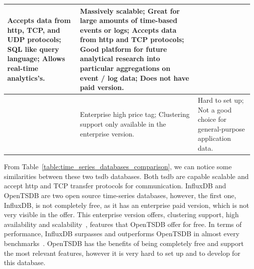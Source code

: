 \begin{table}[H]
\begin{tabularx}{\linewidth} {
            >{\hsize=0.60\hsize}X|
            >{\hsize=1.20\hsize}X|
            >{\hsize=1.20\hsize}X|}
        Accepts data from \gls{http}, TCP, and UDP protocols; \newline
        SQL like query language; \newline
        Allows real-time analytics's.
         & Massively scalable; \newline
        Great for large amounts of time-based events or logs; \newline
        Accepts data from \gls{http} and TCP protocols; \newline
        Good platform for future analytical research into particular aggregations on event / log data; \newline
        Does not have paid version.                                                                                                                                                                                                                                       \\ \hline
        \multicolumn{1}{|l|}{\textbf{Cons}}
         & Enterprise high price tag; \newline
        Clustering support only available in the enterprise version.
         & Hard to set up; \newline
        Not a good choice for general-purpose application data.                                                                                                                                                                                                           \\ \hline
    \end{tabularx}
\end{table}

From Table~\ref{table:time_series_databases_comparison}, we can notice some similarities between these two \gls{tsdb} databases. Both \gls{tsdb} are capable scalable and accept \gls{http} and TCP transfer protocols for communication. InfluxDB and OpenTSDB are two open source time-series databases, however, the first one, InfluxDB, is not completely free, as it has an enterprise paid version, which is not very visible in the offer. This enterprise version offers, clustering support, high availability and scalability~\cite{influxdb_vs_opentsdb}, features that OpenTSDB offer for free. In terms of performance, InfluxDB surpasses and outperforms OpenTSDB in almost every benchmarks~\cite{Noor2017}. OpenTSDB has the benefits of being completely free and support the most relevant features, however it is very hard to set up and to develop for this database.

